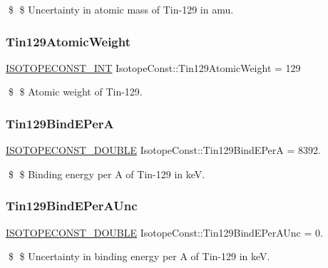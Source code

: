 \$ \$ Uncertainty in atomic mass of Tin-\/129 in amu. \mbox{\label{group___isotope_const-_tin-_sn129_ga6ed9352160ad1b609f1e17993cc5ed16}} 
\subsubsection{\texorpdfstring{Tin129\+Atomic\+Weight}{Tin129AtomicWeight}}
{\footnotesize\ttfamily \mbox{\hyperlink{group___isotope_const-_macros_ga5f18360b3e99483a35c32d789e62621c}{I\+S\+O\+T\+O\+P\+E\+C\+O\+N\+S\+T\+\_\+\+I\+NT}} Isotope\+Const\+::\+Tin129\+Atomic\+Weight = 129}

\$ \$ Atomic weight of Tin-\/129. \mbox{\label{group___isotope_const-_tin-_sn129_ga91838708c578220ab54aaa0d1c9fcdff}} 
\subsubsection{\texorpdfstring{Tin129\+Bind\+E\+PerA}{Tin129BindEPerA}}
{\footnotesize\ttfamily \mbox{\hyperlink{group___isotope_const-_macros_ga8f45a7272ce02c0b4c65c44636ed719a}{I\+S\+O\+T\+O\+P\+E\+C\+O\+N\+S\+T\+\_\+\+D\+O\+U\+B\+LE}} Isotope\+Const\+::\+Tin129\+Bind\+E\+PerA = 8392.}

\$ \$ Binding energy per A of Tin-\/129 in keV. \mbox{\label{group___isotope_const-_tin-_sn129_ga8946495a3bf492fb859fe403a9c20fd2}} 
\subsubsection{\texorpdfstring{Tin129\+Bind\+E\+Per\+A\+Unc}{Tin129BindEPerAUnc}}
{\footnotesize\ttfamily \mbox{\hyperlink{group___isotope_const-_macros_ga8f45a7272ce02c0b4c65c44636ed719a}{I\+S\+O\+T\+O\+P\+E\+C\+O\+N\+S\+T\+\_\+\+D\+O\+U\+B\+LE}} Isotope\+Const\+::\+Tin129\+Bind\+E\+Per\+A\+Unc = 0.}

\$ \$ Uncertainty in binding energy per A of Tin-\/129 in keV. \mbox{\label{group___isotope_const-_tin-_sn129_gaa775831748db60b4c3672fc33781befb}} 
